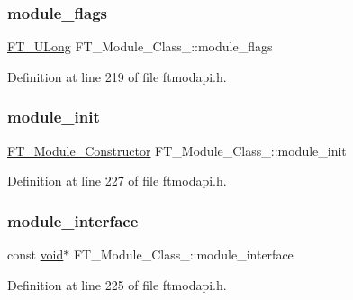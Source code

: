 \subsubsection{\texorpdfstring{module\_flags}{module\_flags}}
{\footnotesize\ttfamily \mbox{\hyperlink{fttypes_8h_a4fac88bdba78eb76b505efa6e4fbf3f5}{F\+T\+\_\+\+U\+Long}} F\+T\+\_\+\+Module\+\_\+\+Class\+\_\+\+::module\+\_\+flags}



Definition at line 219 of file ftmodapi.\+h.

\mbox{\label{struct_f_t___module___class___a60f2bb9eee68366f20fe0613f347ffbd}} 
\subsubsection{\texorpdfstring{module\_init}{module\_init}}
{\footnotesize\ttfamily \mbox{\hyperlink{ftmodapi_8h_ae0a0ec80683e4845d953fcbb7e6af093}{F\+T\+\_\+\+Module\+\_\+\+Constructor}} F\+T\+\_\+\+Module\+\_\+\+Class\+\_\+\+::module\+\_\+init}



Definition at line 227 of file ftmodapi.\+h.

\mbox{\label{struct_f_t___module___class___a320168f227e2d268691429ac0c6b2900}} 
\subsubsection{\texorpdfstring{module\_interface}{module\_interface}}
{\footnotesize\ttfamily const \mbox{\hyperlink{_s_d_l__opengles2__gl2ext_8h_ae5d8fa23ad07c48bb609509eae494c95}{void}}$\ast$ F\+T\+\_\+\+Module\+\_\+\+Class\+\_\+\+::module\+\_\+interface}



Definition at line 225 of file ftmodapi.\+h.

\mbox{\label{struct_f_t___module___class___af25b9e32b6c91e0c31560efb62886ed7}} 
